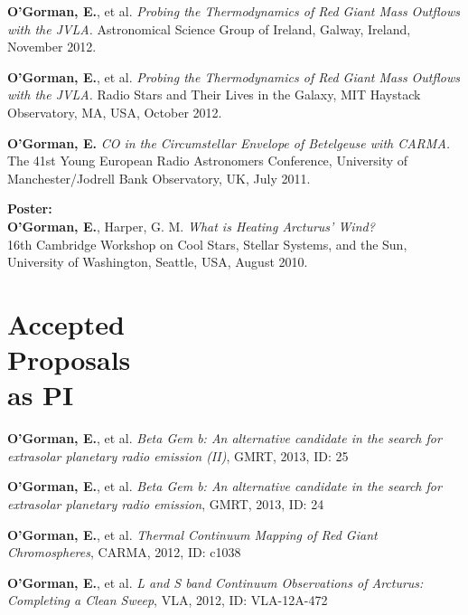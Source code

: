 \documentclass[margin,line]{resume}
\begin{document}
\begin{resume}
	\textbf{O'Gorman, E.}, et al. \textit{Probing the Thermodynamics of Red Giant Mass Outflows with the JVLA.}
Astronomical Science Group of Ireland, Galway, Ireland, November 2012. %
    
\textbf{O'Gorman, E.}, et al. \textit{Probing the Thermodynamics of Red Giant Mass Outflows with the JVLA.}
Radio Stars and Their Lives in the Galaxy, MIT Haystack Observatory, MA, USA, October 2012. %

\textbf{O'Gorman, E.} \textit{CO in the Circumstellar Envelope of Betelgeuse with CARMA.}
The 41st Young European Radio Astronomers Conference, University of Manchester/Jodrell Bank Observatory, UK, July 2011.

    \textbf{Poster:} \vspace{2mm}\\\vspace{1mm}%
    \textbf{O'Gorman, E.}, Harper, G. M. \textit{What is Heating Arcturus' Wind?}\\
16th Cambridge Workshop on Cool Stars, Stellar Systems, and the Sun, University of Washington, Seattle, USA, August 2010.


    \vspace{2mm}
    \section{\mysidestyle Accepted\\Proposals\\as PI}

\textbf{O'Gorman, E.}, et al. \textit{Beta Gem b: An alternative candidate in the search for extrasolar planetary radio emission (II)}, GMRT, 2013, ID: 25%

\textbf{O'Gorman, E.}, et al. \textit{Beta Gem b: An alternative candidate in the search for extrasolar planetary radio emission}, GMRT, 2013, ID: 24%

\textbf{O'Gorman, E.}, et al. \textit{Thermal Continuum Mapping of Red Giant Chromospheres}, CARMA, 2012, ID: c1038%

\textbf{O'Gorman, E.}, et al. \textit{L and S band Continuum Observations of Arcturus: Completing a Clean Sweep}, VLA, 2012, ID: VLA-12A-472%

    \vspace{2mm}

\end{resume}
\end{document}
